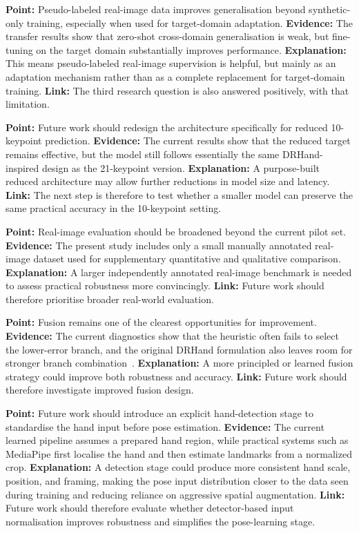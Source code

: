 \documentclass[10pt,letterpaper]{article}
\begin{document}
\medskip
\noindent\textbf{Point:} Pseudo-labeled real-image data improves generalisation beyond synthetic-only training, especially when used for target-domain adaptation.
\textbf{Evidence:} The transfer results show that zero-shot cross-domain generalisation is weak, but fine-tuning on the target domain substantially improves performance.
\textbf{Explanation:} This means pseudo-labeled real-image supervision is helpful, but mainly as an adaptation mechanism rather than as a complete replacement for target-domain training.
\textbf{Link:} The third research question is also answered positively, with that limitation.

\medskip
\noindent\textbf{Point:} Future work should redesign the architecture specifically for reduced 10-keypoint prediction.
\textbf{Evidence:} The current results show that the reduced target remains effective, but the model still follows essentially the same DRHand-inspired design as the 21-keypoint version.
\textbf{Explanation:} A purpose-built reduced architecture may allow further reductions in model size and latency.
\textbf{Link:} The next step is therefore to test whether a smaller model can preserve the same practical accuracy in the 10-keypoint setting.

\medskip
\noindent\textbf{Point:} Real-image evaluation should be broadened beyond the current pilot set.
\textbf{Evidence:} The present study includes only a small manually annotated real-image dataset used for supplementary quantitative and qualitative comparison.
\textbf{Explanation:} A larger independently annotated real-image benchmark is needed to assess practical robustness more convincingly.
\textbf{Link:} Future work should therefore prioritise broader real-world evaluation.

\medskip
\noindent\textbf{Point:} Fusion remains one of the clearest opportunities for improvement.
\textbf{Evidence:} The current diagnostics show that the heuristic often fails to select the lower-error branch, and the original DRHand formulation also leaves room for stronger branch combination~\cite{dualreg}.
\textbf{Explanation:} A more principled or learned fusion strategy could improve both robustness and accuracy.
\textbf{Link:} Future work should therefore investigate improved fusion design.

\medskip
\noindent\textbf{Point:} Future work should introduce an explicit hand-detection stage to standardise the hand input before pose estimation.
\textbf{Evidence:} The current learned pipeline assumes a prepared hand region, while practical systems such as MediaPipe first localise the hand and then estimate landmarks from a normalized crop.
\textbf{Explanation:} A detection stage could produce more consistent hand scale, position, and framing, making the pose input distribution closer to the data seen during training and reducing reliance on aggressive spatial augmentation.
\textbf{Link:} Future work should therefore evaluate whether detector-based input normalisation improves robustness and simplifies the pose-learning stage.
\end{document}
